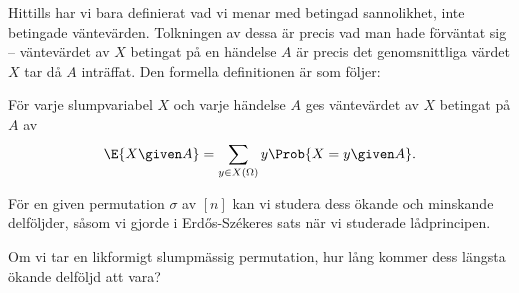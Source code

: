 \documentclass[nobib]{tufte-handout}
\begin{document}
Hittills har vi bara definierat vad vi menar med betingad sannolikhet, inte betingade väntevärden. Tolkningen av dessa är precis vad man hade förväntat sig -- väntevärdet av $X$ betingat på en händelse $A$ är precis det genomsnittliga värdet $X$ tar då $A$ inträffat. Den formella definitionen är som följer:

\begin{definition}
  För varje slumpvariabel $X$ och varje händelse $A$ ges väntevärdet av $X$ betingat på $A$ av
  $$\E{X \given A} = \sum_{y \in X(\Omega)} y \Prob{X = y \given A}.$$
\end{definition}

För en given permutation $\sigma$ av $[n]$ kan vi studera dess ökande och minskande delföljder, såsom vi gjorde i Erd\H{o}s-Székeres sats när vi studerade lådprincipen.

Om vi tar en likformigt slumpmässig permutation, hur lång kommer dess längsta ökande delföljd att vara?
\end{document}
